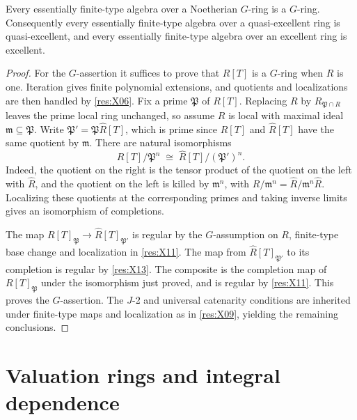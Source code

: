 \begin{theorem}\label{res:X14}
Every essentially finite-type algebra over a Noetherian \(G\)-ring is a \(G\)-ring. Consequently every essentially finite-type algebra over a quasi-excellent ring is quasi-excellent, and every essentially finite-type algebra over an excellent ring is excellent.
\end{theorem}
\begin{proof}
For the \(G\)-assertion it suffices to prove that \(R[T]\) is a \(G\)-ring when \(R\) is one. Iteration gives finite polynomial extensions, and quotients and localizations are then handled by \ref{res:X06}. Fix a prime \(\mathfrak P\) of \(R[T]\). Replacing \(R\) by \(R_{\mathfrak P\cap R}\) leaves the prime local ring unchanged, so assume \(R\) is local with maximal ideal \(\mathfrak m\subseteq\mathfrak P\). Write \(\mathfrak P'=\mathfrak P\widehat R[T]\), which is prime since \(R[T]\) and \(\widehat R[T]\) have the same quotient by \(\mathfrak m\). There are natural isomorphisms
\[
    R[T]/\mathfrak P^n \;\cong\;
       \widehat R[T]/(\mathfrak P')^n .
\]
Indeed, the quotient on the right is the tensor product of the quotient on the left with \(\widehat R\), and the quotient on the left is killed by \(\mathfrak m^n\), with \(R/\mathfrak m^n=\widehat R/\mathfrak m^n\widehat R\). Localizing these quotients at the corresponding primes and taking inverse limits gives an isomorphism of completions.

The map \(R[T]_{\mathfrak P}\to\widehat R[T]_{\mathfrak P'}\) is regular by the \(G\)-assumption on \(R\), finite-type base change and localization in \ref{res:X11}. The map from \(\widehat R[T]_{\mathfrak P'}\) to its completion is regular by \ref{res:X13}. The composite is the completion map of \(R[T]_{\mathfrak P}\) under the isomorphism just proved, and is regular by \ref{res:X11}. This proves the \(G\)-assertion. The \(J\)-2 and universal catenarity conditions are inherited under finite-type maps and localization as in \ref{res:X09}, yielding the remaining conclusions.
\end{proof}

\section[Valuation rings]{Valuation rings and integral dependence}

